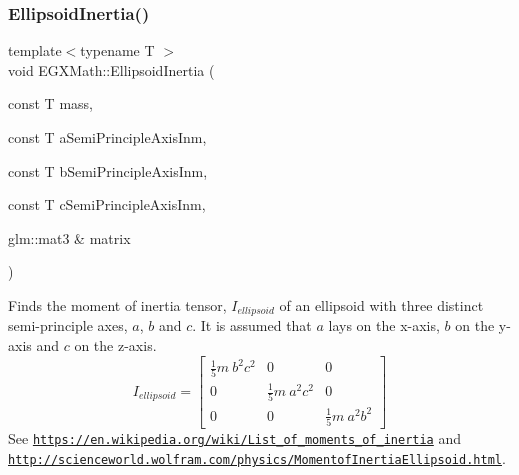 \subsubsection{\texorpdfstring{Ellipsoid\+Inertia()}{EllipsoidInertia()}\hspace{0.1cm}{\footnotesize\ttfamily [3/3]}}
{\footnotesize\ttfamily template$<$typename T $>$ \\
void E\+G\+X\+Math\+::\+Ellipsoid\+Inertia (\begin{DoxyParamCaption}\item[{const T}]{mass,  }\item[{const T}]{a\+Semi\+Principle\+Axis\+Inm,  }\item[{const T}]{b\+Semi\+Principle\+Axis\+Inm,  }\item[{const T}]{c\+Semi\+Principle\+Axis\+Inm,  }\item[{glm\+::mat3 \&}]{matrix }\end{DoxyParamCaption})}



Finds the moment of inertia tensor, $I_{ellipsoid}$ of an ellipsoid with three distinct semi-\/principle axes, $a$, $b$ and $c$. It is assumed that $a$ lays on the x-\/axis, $b$ on the y-\/axis and $c$ on the z-\/axis. \[ I_{ellipsoid}=\begin{bmatrix} \frac{1}{5}m\ b^2c^2 & 0 & 0\\ 0 & \frac{1}{5}m\ a^2c^2 & 0\\ 0 & 0 & \frac{1}{5}m\ a^2b^2 \end{bmatrix} \] See \href{https://en.wikipedia.org/wiki/List_of_moments_of_inertia}{\tt https\+://en.\+wikipedia.\+org/wiki/\+List\+\_\+of\+\_\+moments\+\_\+of\+\_\+inertia} and \href{http://scienceworld.wolfram.com/physics/MomentofInertiaEllipsoid.html}{\tt http\+://scienceworld.\+wolfram.\+com/physics/\+Momentof\+Inertia\+Ellipsoid.\+html}. 


